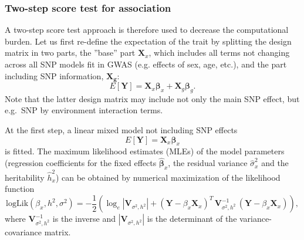 \documentclass[12pt,a4paper]{article}
\begin{document}
\subsubsection{Two-step score test for association}
A two-step score test approach is therefore used to decrease the computational
burden. Let us first re-define the expectation of the trait by splitting the
design matrix in two parts, the ''base'' part $\mathbf{X}_x$, which includes all
terms not changing across all SNP models fit in GWAS (e.g. effects of sex, age, etc.),
and the part including SNP information, $\mathbf{X_g}$:
$$
E[\mathbf{Y}] = \mathbf{X}_x \mathbf{\beta}_x +
\mathbf{X}_g \mathbf{\beta}_g.
$$
Note that the latter design matrix may include not only the main SNP effect, but
e.g.\ SNP by environment interaction terms.

At the first step, a linear mixed model not including SNP effects
$$
E[\mathbf{Y}] = \mathbf{X}_x \mathbf{\beta}_x
$$
is fitted. The maximum likelihood estimates (MLEs) of the model parameters (regression coefficients for
the fixed effects $\hat{\mathbf{\beta}}_x$, the
residual variance $\hat{\sigma}^2_x$ and the heritability $\hat{h}^2_x$) can
be obtained by numerical maximization of the likelihood function
$$
\mathrm{logLik}(\beta_x,h^2,\sigma^2) = -\frac{1}{2} \left(
  \log_e|\mathbf{V}_{\sigma^2,h^2}| + (\mathbf{Y} - \beta_x
  \mathbf{X}_x)^T \, \mathbf{V}_{\sigma^2,h^2}^{-1} \, (\mathbf{Y} -
  \beta_x \mathbf{X}_x) \right ),
$$
where $\mathbf{V}_{\sigma^2,h^2}^{-1}$ is the inverse and
$|\mathbf{V}_{\sigma^2,h^2}|$ is the determinant of the variance-covariance matrix.
\end{document}
